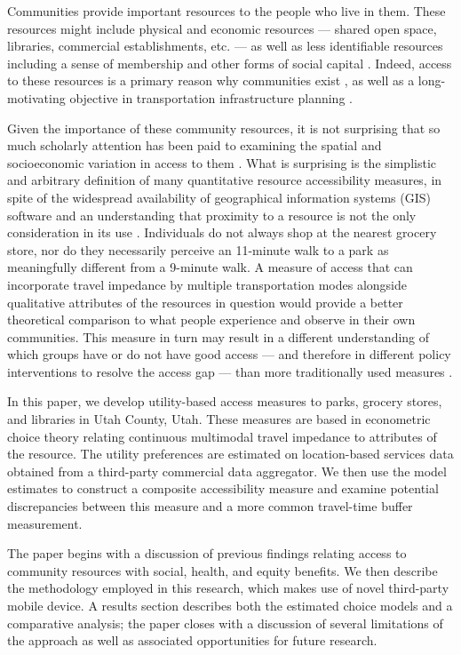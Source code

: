 \documentclass[3p, authoryear, review]{elsarticle} %
\begin{document}
Communities provide important resources to the people who live in them. These
resources might include physical and economic resources
--- shared open space, libraries, commercial establishments, etc. --- as well as less identifiable resources
including a sense of membership and other forms of social capital
\citep{lochner1999}. Indeed, access to these resources is a primary reason why
communities exist \citep{muth1971}, as well as a long-motivating objective in
transportation infrastructure planning \citep{hansen1959}.

Given the importance of these community resources, it is not surprising that
so much scholarly attention has been paid to examining the spatial and
socioeconomic variation in access to them \citep{handy1997, witten2003}. What
is surprising is the simplistic and arbitrary definition of many
quantitative resource accessibility measures, in spite of the widespread
availability of geographical information systems (GIS) software \citep{logan2019} and
an understanding that proximity to a resource is not the only consideration
in its use \citep{dong2006}. Individuals do not always shop at the nearest grocery
store, nor do they necessarily perceive an 11-minute walk to a park as
meaningfully different from a 9-minute walk. A measure of access that can
incorporate travel impedance by multiple transportation modes alongside
qualitative attributes of the resources in question would provide a better
theoretical comparison to what people experience and observe in their own
communities. This measure in turn may result in a different understanding
of which groups have or do not have good access --- and therefore in different
policy interventions to resolve the access gap --- than more traditionally used
measures \citep{logan2019, macfarlane2020}.

In this paper, we develop utility-based access measures to parks, grocery stores, and
libraries in Utah County, Utah. These measures are based in econometric choice
theory relating continuous multimodal travel impedance to attributes of the
resource. The utility preferences are estimated on location-based services data
obtained from a third-party commercial data aggregator. We then use the model
estimates to construct a composite accessibility measure and examine potential
discrepancies between this measure and a more common travel-time buffer
measurement.

The paper begins with a discussion of previous findings relating access to
community resources with social, health, and equity benefits. We then describe
the methodology employed in this research, which makes use of novel third-party
mobile device. A results section describes both the estimated choice models and
a comparative analysis; the paper closes with a discussion of several
limitations of the approach as well as associated opportunities for future research.
\end{document}
